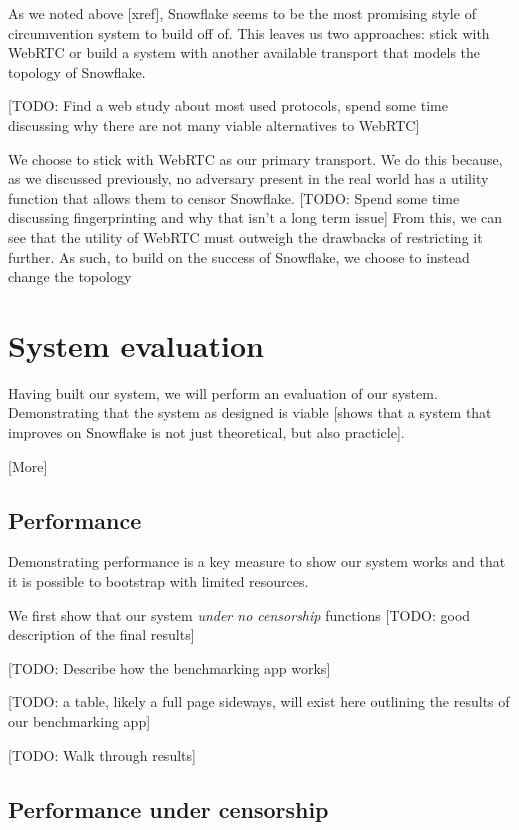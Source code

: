 \documentclass[12pt]{report}
\begin{document}
As we noted above [xref], Snowflake seems to be the most promising style of circumvention system to build off of. This leaves us two approaches: stick with WebRTC or build a system with another available transport that models the topology of Snowflake.

[TODO: Find a web study about most used protocols, spend some time discussing why there are not many viable alternatives to WebRTC]

We choose to stick with WebRTC as our primary transport. We do this because, as we discussed previously, no adversary present in the real world has a utility function that allows them to censor Snowflake. [TODO: Spend some time discussing fingerprinting and why that isn't a long term issue] From this, we can see that the utility of WebRTC must outweigh the drawbacks of restricting it further. As such, to build on the success of Snowflake, we choose to instead change the topology

\chapter{System evaluation}

Having built our system, we will perform an evaluation of our system. Demonstrating that the system as designed is viable [shows that a system that improves on Snowflake is not just theoretical, but also practicle].

[More]

\section{Performance}

Demonstrating performance is a key measure to show our system works and that it is possible to bootstrap with limited resources.

We first show that our system \emph{under no censorship} functions [TODO: good description of the final results]

[TODO: Describe how the benchmarking app works]

[TODO: a table, likely a full page sideways, will exist here outlining the results of our benchmarking app]

[TODO: Walk through results]

\section{Performance under censorship}
\end{document}
